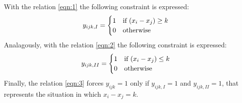 With the relation \ref{eqn:1} the following constraint is expressed:
\[
y_{ijk, I} = 
\begin{cases}
1	&	\text{if $ (x_{i} - x_{j}) \ge k $}	\\
0	&	\text{otherwise}
\end{cases}
\]
Analagously, with the relation \ref{eqn:2} the following constraint is expressed:
\[
y_{ijk, II} = 
\begin{cases}
1	&	\text{if $ (x_{i} - x_{j}) \le k $}	\\
0	&	\text{otherwise}
\end{cases}
\]
Finally, the relation \ref{eqn:3} forces $ y_{ijk} = 1 $ only if $ y_{ijk, I} = 1 $ and $ y_{ijk, II} = 1 $, that represents the situation in which $ x_{i} - x_{j} = k $.